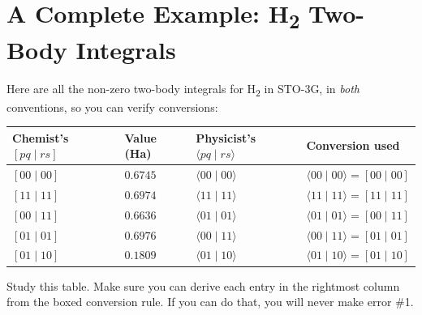 \documentclass[
  11pt,
  oneside]{book}
\begin{document}
\section{A Complete Example: H\textsubscript{2} Two-Body
Integrals}\label{a-complete-example-hux2082-two-body-integrals}

Here are all the non-zero two-body integrals for H\textsubscript{2} in STO-3G, in
\emph{both} conventions, so you can verify conversions:

\begin{longtable}[]{@{}
  >{\centering\arraybackslash}p{}
  >{\centering\arraybackslash}p{}
  >{\centering\arraybackslash}p{}
  >{\raggedright\arraybackslash}p{}@{}}
\toprule\noalign{}
\begin{minipage}[b]{\linewidth}\centering
Chemist's \([pq \mid rs]\)
\end{minipage} & \begin{minipage}[b]{\linewidth}\centering
Value (Ha)
\end{minipage} & \begin{minipage}[b]{\linewidth}\centering
Physicist's \(\langle pq \mid rs\rangle\)
\end{minipage} & \begin{minipage}[b]{\linewidth}\raggedright
Conversion used
\end{minipage} \\
\midrule\noalign{}
\endhead
\bottomrule\noalign{}
\endlastfoot
\([00 \mid 00]\) & \(0.6745\) & \(\langle 00 \mid 00\rangle\) &
\(\langle 00 \mid 00\rangle = [00 \mid 00]\) \\
\([11 \mid 11]\) & \(0.6974\) & \(\langle 11 \mid 11\rangle\) &
\(\langle 11 \mid 11\rangle = [11 \mid 11]\) \\
\([00 \mid 11]\) & \(0.6636\) & \(\langle 01 \mid 01\rangle\) &
\(\langle 01 \mid 01\rangle = [00 \mid 11]\) \\
\([01 \mid 01]\) & \(0.6976\) & \(\langle 00 \mid 11\rangle\) &
\(\langle 00 \mid 11\rangle = [01 \mid 01]\) \\
\([01 \mid 10]\) & \(0.1809\) & \(\langle 01 \mid 10\rangle\) &
\(\langle 01 \mid 10\rangle = [01 \mid 10]\) \\
\end{longtable}

Study this table. Make sure you can derive each entry in the rightmost
column from the boxed conversion rule. If you can do that, you will
never make error \#1.
\end{document}
